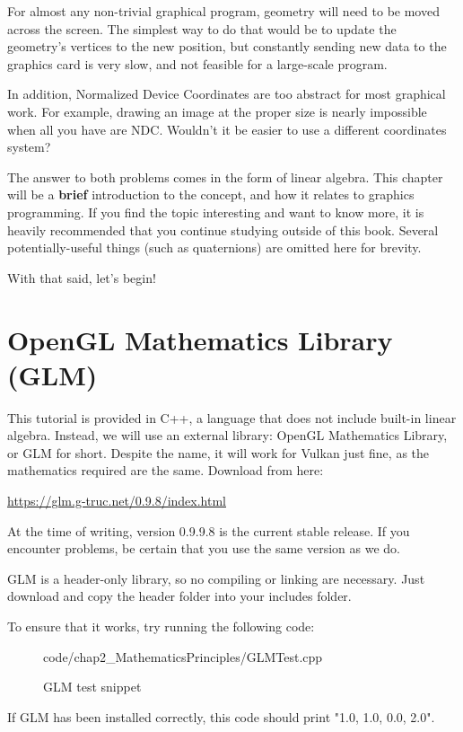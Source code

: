 For almost any non-trivial graphical program, geometry will need to be moved across the screen. The simplest way to do that would be to update the geometry's vertices to the new position, but constantly sending new data to the graphics card is very slow, and not feasible for a large-scale program.

In addition, Normalized Device Coordinates are too abstract for most graphical work. For example, drawing an image at the proper size is nearly impossible when all you have are NDC. Wouldn't it be easier to use a different coordinates system?

The answer to both problems comes in the form of linear algebra. This chapter will be a \textbf{brief} introduction to the concept, and how it relates to graphics programming. If you find the topic interesting and want to know more, it is heavily recommended that you continue studying outside of this book. Several potentially-useful things (such as quaternions) are omitted here for brevity.

With that said, let's begin!

\section{\textsf{OpenGL Mathematics Library (GLM)}}
This tutorial is provided in C++, a language that does not include built-in linear algebra. Instead, we will use an external library: OpenGL Mathematics Library, or GLM for short. Despite the name, it will work for Vulkan just fine, as the mathematics required are the same. Download from here:

\href{https://glm.g-truc.net/0.9.8/index.html}{https://glm.g-truc.net/0.9.8/index.html}

At the time of writing, version 0.9.9.8 is the current stable release. If you encounter problems, be certain that you use the same version as we do.

GLM is a header-only library, so no compiling or linking are necessary. Just download and copy the header folder into your includes folder.

To ensure that it works, try running the following code:

\begin{figure}[ht]
    \centering
    \colorbox{backgroundcolor}{
        \parbox{0.9\textwidth}{
            
            {code/chap2_MathematicsPrinciples/GLMTest.cpp}
        }
    }
    \caption{GLM test snippet}
    \label{fig:glm_snippet}
\end{figure}

If GLM has been installed correctly, this code should print "{1.0, 1.0, 0.0, 2.0}".